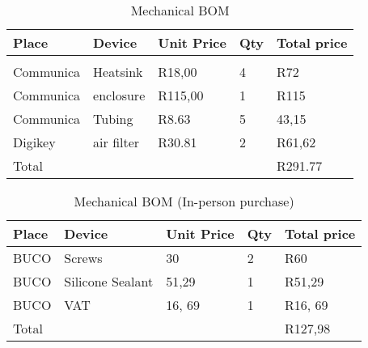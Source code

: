 \documentclass[class=report,11pt,crop=false]{standalone}
\begin{document}
\begin{table}
\centering

\begin{tabular}{|l |l |l |l |l|} \hline 
Place & Device & Unit Price & Qty & Total price \\ \hline 
 &  &  &  &  \\ \hline 
Communica & Heatsink & R18,00 & 4 & R72 \\ \hline 
Communica & enclosure & R115,00 & 1 & R115 \\ \hline 
Communica & Tubing & R8.63 & 5 & 43,15 \\ \hline 
Digikey & air filter & R30.81 & 2 & R61,62 \\ \hline 
Total &  &  &  & R291.77 \\ \hline

\end{tabular}
\caption{Mechanical BOM }
\label{tab: Mechanical BOM (Online)}
\end{table}

 

\begin{table}
\centering

\begin{tabular}{|l |l |l |l |l|} \hline 
Place & Device & Unit Price & Qty & Total price \\ \hline 
BUCO & Screws & 30 & 2 & R60 \\ \hline 
BUCO & Silicone Sealant & 51,29 & 1 & R51,29 \\ \hline 
BUCO & VAT & 16, 69 & 1 & R16, 69 \\ \hline 
Total &  &  &  & R127,98 \\ \hline

\end{tabular}
\caption{Mechanical BOM (In-person purchase)}
\label{tab:Mechanical BOM (In-person purchase)}
\end{table}
\end{document}
